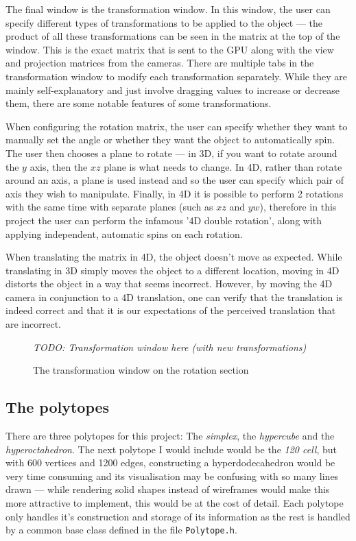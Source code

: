 \documentclass[11pt, a4paper]{article}
\begin{document}
The final window is the transformation window. In this window, the user can specify different types of transformations to be applied to the object --- the product of all these transformations can be seen in the matrix at the top of the window. This is the exact matrix that is sent to the GPU along with the view and projection matrices from the cameras. There are multiple tabs in the transformation window to modify each transformation separately. While they are mainly self-explanatory and just involve dragging values to increase or decrease them, there are some notable features of some transformations.

When configuring the rotation matrix, the user can specify whether they want to manually set the angle or whether they want the object to automatically spin. The user then chooses a plane to rotate --- in 3D, if you want to rotate around the $y$ axis, then the $xz$ plane is what needs to change. In 4D, rather than rotate around an axis, a plane is used instead and so the user can specify which pair of axis they wish to manipulate. Finally, in 4D it is possible to perform 2 rotations with the same time with separate planes (such as $xz$ and $yw$), therefore in this project the user can perform the infamous '4D double rotation', along with applying independent, automatic spins on each rotation.

When translating the matrix in 4D, the object doesn't move as expected. While translating in 3D simply moves the object to a different location, moving in 4D distorts the object in a way that seems incorrect. However, by moving the 4D camera in conjunction to a 4D translation, one can verify that the translation is indeed correct and that it is our expectations of the perceived translation that are incorrect.

\begin{figure}[!h]
  \centering
  \emph{TODO: Transformation window here (with new transformations)}
  \caption{The transformation window on the rotation section}
  \label{fig:informationWindow}
\end{figure}

\subsection{The polytopes}

There are three polytopes for this project: The \emph{simplex}, the \emph{hypercube} and the \emph{hyperoctahedron}. The next polytope I would include would be the \emph{120 cell}, but with 600 vertices and 1200 edges, constructing a hyperdodecahedron would be very time consuming and its visualisation may be confusing with so many lines drawn --- while rendering solid shapes instead of wireframes would make this more attractive to implement, this would be at the cost of detail. Each polytope only handles it's construction and storage of its information as the rest is handled by a common base class defined in the file \texttt{Polytope.h}.
\end{document}

